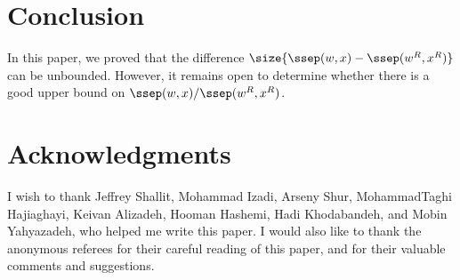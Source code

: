 \documentclass[preprint, 12pt]{elsarticle}
\begin{document}
	\section{Conclusion}
	In this paper, we proved that the difference $\size{\ssep(w,x) - \ssep(w^R,x^R)}$ can be unbounded. However, it remains open to determine whether there is a good upper bound on $\ssep(w,x) / \ssep(w^R,x^R)$.

	\section*{Acknowledgments}
I wish to thank Jeffrey Shallit, Mohammad Izadi, Arseny Shur, MohammadTaghi Hajiaghayi, Keivan Alizadeh, Hooman Hashemi, Hadi Khodabandeh, and Mobin Yahyazadeh, who helped me write this paper. I would also like to thank the anonymous referees for their careful reading of this paper, and for their valuable comments and suggestions. 
	
\end{document}
